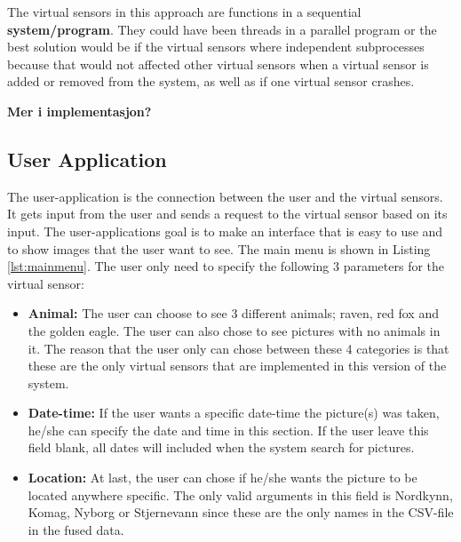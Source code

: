 \documentclass[USenglish]{uit-thesis}
\begin{document}
The virtual sensors in this approach are functions in a sequential \textbf{system/program}. They could have been threads in a parallel program or the best solution would be if the virtual sensors where independent subprocesses because that would not affected other virtual sensors when a virtual sensor is added or removed from the system, as well as if one virtual sensor crashes.

\textbf{Mer i implementasjon?}



\subsection{User Application}
The user-application is the connection between the user and the virtual sensors. It gets input from the user and sends a request to the virtual sensor based on its input. The user-applications goal is to make an interface that is easy to use and to show images that the user want to see. The main menu is shown in Listing \ref{lst:mainmenu}.
The user only need to specify the following 3 parameters for the virtual sensor:

\begin{itemize}
\item \textbf{Animal:} The user can choose to see 3 different animals; raven, red fox and the golden eagle. The user can also chose to see pictures with no animals in it. The reason that the user only can chose between these 4 categories is that these are the only virtual sensors that are implemented in this version of the system.

\item \textbf{Date-time:} If the user wants a specific date-time the picture(s) was taken, he/she can specify the date and time in this section. If the user leave this field blank, all dates will included when the system search for pictures.

\item \textbf{Location:} At last, the user can chose if he/she wants the picture to be located anywhere specific. The only valid arguments in this field is Nordkynn, Komag, Nyborg or Stjernevann since these are the only names in the CSV-file in the fused data.
\end{itemize}
\end{document}
